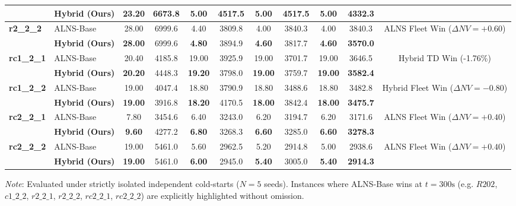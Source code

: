 \begin{table}[!htbp]
\begin{tabular*}{\textwidth}{@{\extracolsep{\fill}} ll cccccc cc c @{}}
 & \textbf{Hybrid (Ours)} & \textbf{23.20} & 6673.8 & \textbf{5.00} & 4517.5 & \textbf{5.00} & 4517.5 & \textbf{5.00} & \textbf{4332.3} & \\
\midrule
\multirow{2}{*}{\textbf{r2\_2\_2}} & ALNS-Base & 28.00 & 6999.6 & 4.40 & 3809.8 & 4.00 & 3840.3 & 4.00 & 3840.3 & \multirow{2}{*}{ALNS Fleet Win ($\Delta NV=+0.60$)} \\
 & \textbf{Hybrid (Ours)} & \textbf{28.00} & 6999.6 & \textbf{4.80} & 3894.9 & \textbf{4.60} & 3817.7 & \textbf{4.60} & \textbf{3570.0} & \\
\midrule
\multirow{2}{*}{\textbf{rc1\_2\_1}} & ALNS-Base & 20.40 & 4185.8 & 19.00 & 3925.9 & 19.00 & 3701.7 & 19.00 & 3646.5 & \multirow{2}{*}{Hybrid TD Win (-1.76\%)} \\
 & \textbf{Hybrid (Ours)} & \textbf{20.20} & 4448.3 & \textbf{19.20} & 3798.0 & \textbf{19.00} & 3759.7 & \textbf{19.00} & \textbf{3582.4} & \\
\midrule
\multirow{2}{*}{\textbf{rc1\_2\_2}} & ALNS-Base & 19.00 & 4047.4 & 18.80 & 3790.9 & 18.80 & 3488.6 & 18.80 & 3482.8 & \multirow{2}{*}{Hybrid Fleet Win ($\Delta NV=-0.80$)} \\
 & \textbf{Hybrid (Ours)} & \textbf{19.00} & 3916.8 & \textbf{18.20} & 4170.5 & \textbf{18.00} & 3842.4 & \textbf{18.00} & \textbf{3475.7} & \\
\midrule
\multirow{2}{*}{\textbf{rc2\_2\_1}} & ALNS-Base & 7.80 & 3454.6 & 6.40 & 3243.0 & 6.20 & 3194.7 & 6.20 & 3171.6 & \multirow{2}{*}{ALNS Fleet Win ($\Delta NV=+0.40$)} \\
 & \textbf{Hybrid (Ours)} & \textbf{9.60} & 4277.2 & \textbf{6.80} & 3268.3 & \textbf{6.60} & 3285.0 & \textbf{6.60} & \textbf{3278.3} & \\
\midrule
\multirow{2}{*}{\textbf{rc2\_2\_2}} & ALNS-Base & 19.00 & 5461.0 & 5.60 & 2962.5 & 5.20 & 2914.8 & 5.00 & 2938.6 & \multirow{2}{*}{ALNS Fleet Win ($\Delta NV=+0.40$)} \\
 & \textbf{Hybrid (Ours)} & \textbf{19.00} & 5461.0 & \textbf{6.00} & 2945.0 & \textbf{5.40} & 3005.0 & \textbf{5.40} & \textbf{2914.3} & \\
\bottomrule
\end{tabular*}
{\raggedright \scriptsize \textit{Note}: Evaluated under strictly isolated independent cold-starts ($N=5$ seeds). Instances where ALNS-Base wins at $t=300\text{s}$ (e.g. $R202$, $c1\_2\_2$, $r2\_2\_1$, $r2\_2\_2$, $rc2\_2\_1$, $rc2\_2\_2$) are explicitly highlighted without omission.\par}
\end{table}
